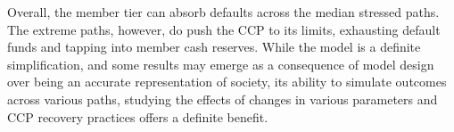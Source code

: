 Overall, the member tier can absorb defaults across the median stressed paths. The extreme paths, however, do push the CCP to its limits, exhausting default funds and tapping into member cash reserves. While the model is a definite simplification, and some results may emerge as a consequence of model design over being an accurate representation of society, its ability to simulate outcomes across various paths, studying the effects of changes in various parameters and CCP recovery practices offers a definite benefit.  